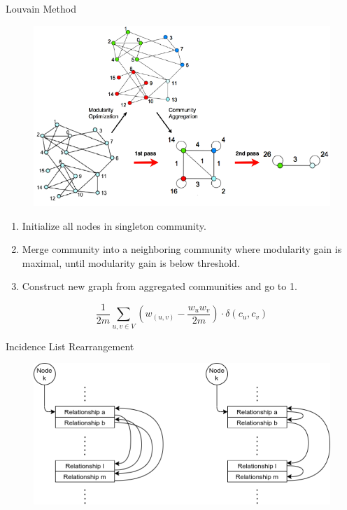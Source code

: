 \documentclass[rgb]{beamer}
\begin{document}
        \begin{frame}[allowframebreaks]{Louvain Method}
            \begin{figure}
                \begin{center}
                \includegraphics[keepaspectratio, height=0.8\textheight, width=.8\textwidth]{img/louvain.png}
                \end{center}
            \end{figure}
            
            \framebreak
            
            \begin{enumerate}
             \item Initialize all nodes in singleton community.
             \item Merge community into a neighboring community where modularity gain is maximal, until modularity gain is below threshold.
             \item Construct new graph from aggregated communities and go to 1.
            \end{enumerate}
            \vspace{2em}
            \[ \frac{1}{2m} \sum_{u,v \in V} \left( w_{(u, v)} - \frac{w_u w_v}{2m} \right) \cdot \delta (c_u, c_v) \]
            
        \end{frame}
    
        \begin{frame}{Incidence List Rearrangement}
            \begin{figure}
                \begin{center}
                    \includegraphics[keepaspectratio, height=0.65\textheight, width=.65\textwidth]{img/incl.png}
                \end{center}
            \end{figure}
        \end{frame}
        
\end{document}
